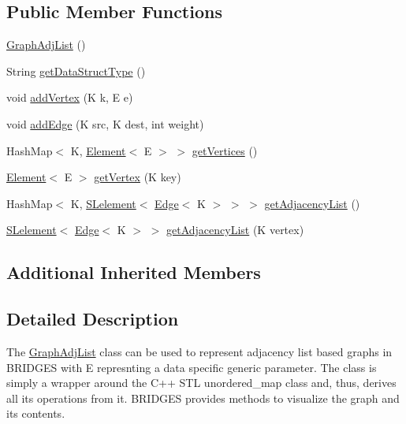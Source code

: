 \subsection*{Public Member Functions}
\begin{DoxyCompactItemize}
\item 
\hyperlink{classbridges_1_1base_1_1_graph_adj_list_a822f5f0981773a227c98c463850a0700}{Graph\+Adj\+List} ()
\item 
String \hyperlink{classbridges_1_1base_1_1_graph_adj_list_a6995a5dcee3b07e041e12e27241f9423}{get\+Data\+Struct\+Type} ()
\item 
void \hyperlink{classbridges_1_1base_1_1_graph_adj_list_a2fdb7b6c143d1beb245a333db105372c}{add\+Vertex} (K k, E e)
\item 
void \hyperlink{classbridges_1_1base_1_1_graph_adj_list_a955fd8c7211f482826b47ad800702c10}{add\+Edge} (K src, K dest, int weight)
\item 
Hash\+Map$<$ K, \hyperlink{classbridges_1_1base_1_1_element}{Element}$<$ E $>$ $>$ \hyperlink{classbridges_1_1base_1_1_graph_adj_list_a19abf0bd09f0420e61cc144aec141f0a}{get\+Vertices} ()
\item 
\hyperlink{classbridges_1_1base_1_1_element}{Element}$<$ E $>$ \hyperlink{classbridges_1_1base_1_1_graph_adj_list_a0dd774aaa0ca1812880ec517e6bc4ed4}{get\+Vertex} (K key)
\item 
Hash\+Map$<$ K, \hyperlink{classbridges_1_1base_1_1_s_lelement}{S\+Lelement}$<$ \hyperlink{classbridges_1_1base_1_1_edge}{Edge}$<$ K $>$ $>$ $>$ \hyperlink{classbridges_1_1base_1_1_graph_adj_list_a61ebebad4b053797240fef2b42b57630}{get\+Adjacency\+List} ()
\item 
\hyperlink{classbridges_1_1base_1_1_s_lelement}{S\+Lelement}$<$ \hyperlink{classbridges_1_1base_1_1_edge}{Edge}$<$ K $>$ $>$ \hyperlink{classbridges_1_1base_1_1_graph_adj_list_a331531e9ce428c35321fae6df143fbcf}{get\+Adjacency\+List} (K vertex)
\end{DoxyCompactItemize}
\subsection*{Additional Inherited Members}


\subsection{Detailed Description}
The \hyperlink{classbridges_1_1base_1_1_graph_adj_list}{Graph\+Adj\+List} class can be used to represent adjacency list based graphs in B\+R\+I\+D\+G\+ES with E represnting a data specific generic parameter. The class is simply a wrapper around the C++ S\+TL unordered\+\_\+map class and, thus, derives all its operations from it. B\+R\+I\+D\+G\+ES provides methods to visualize the graph and its contents. 

